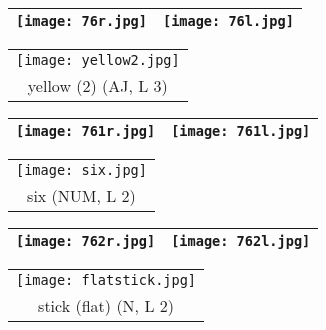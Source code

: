 \documentclass{tufte-book}
\begin{document}
\begin{fullwidth}
\begin{table*}[h!]
\begin{tabular}{ccc}
  \end{tabular}
\end{table*}

\newpage

\begin{table}[h!]
\begin{tabular}{|c|c|}
\hline
\texttt{[image: 76r.jpg]} & \texttt{[image: 76l.jpg]}\\
\hline
\end{tabular}
\label{page:76}
\end{table}

 \begin{table*}[h!]
\begin{tabular}{c}
   \texttt{[image: yellow2.jpg]}\\
    yellow (2) (AJ, L 3)\\%
  
  \end{tabular}
\end{table*}

\begin{table}[h!]
\begin{tabular}{|c|c|}
\hline
\texttt{[image: 761r.jpg]} & \texttt{[image: 761l.jpg]}\\
\hline
\end{tabular}
\label{page:761}
\end{table}

 \begin{table*}[h!]
\begin{tabular}{c}
   \texttt{[image: six.jpg]}\\
    six (NUM, L 2)\\%
  
  \end{tabular}
\end{table*}

\begin{table}[h!]
\begin{tabular}{|c|c|}
\hline
\texttt{[image: 762r.jpg]} & \texttt{[image: 762l.jpg]}\\
\hline
\end{tabular}
\label{page:762}
\end{table}

 \begin{table*}[h!]
\begin{tabular}{c}
   \texttt{[image: flatstick.jpg]}\\
    stick (flat) (N, L 2)\\%
  

\end{tabular}
\end{table*}
\end{fullwidth}
\end{document}
